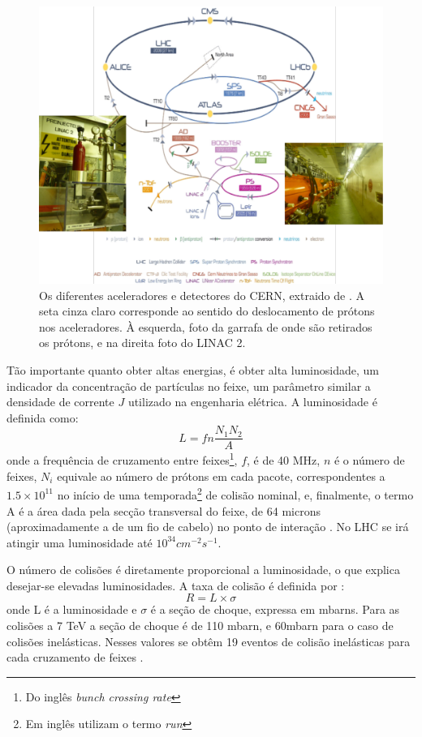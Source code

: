 \begin{figure}[h!t]
\centering
\includegraphics[width=\textwidth]{imagens/lhc_garrafa_linac2.pdf}
\caption{Os diferentes aceleradores e detectores do CERN, extraido de
\cite{cern_accelerators}. A seta cinza claro corresponde ao sentido do
deslocamento de prótons nos aceleradores. À esquerda, foto da garrafa
de onde são retirados os prótons, e na direita foto do LINAC 2.}
\label{fig:esquema_aceleradores}
\end{figure}

Tão importante quanto obter altas energias, é obter alta
luminosidade, um indicador da concentração 
de partículas no feixe, um parâmetro similar a densidade de 
corrente $J$ utilizado na engenharia elétrica. A luminosidade é definida como:
\begin{equation}
L=fn\frac{N_1 N_2}{A}
\label{eq:luminosidade}
\end{equation}
onde a frequência de cruzamento entre feixes\footnote{Do
inglês \emph{bunch crossing rate}}, $f$, é de 
40 MHz, $n$ é o número de feixes, $N_i$ equivale ao número de prótons em
cada pacote, correspondentes a $1.5\times10^{11}$ no início de uma
temporada\footnote{Em inglês utilizam o termo \emph{run}} de colisão nominal, e,
finalmente, o termo A é a área dada pela secção transversal do feixe, 
de 64 microns (aproximadamente a de um fio de cabelo)  no ponto de interação \cite{webLHC}. No LHC se
irá atingir uma luminosidade até $10^{34}cm^{-2}s^{-1}$.

O número de colisões é diretamente proporcional a luminosidade, o que explica
desejar-se elevadas luminosidades. A taxa de colisão é definida por
\cite{ATLAS_TDR}:
\begin{equation}
R = L \times \sigma
\label{eq:taxa_colisao}
\end{equation}
onde L é a luminosidade e $\sigma$ é a seção de choque,
expressa em mbarns. Para as colisões a 7 TeV a seção de choque é de 110 mbarn, e
60mbarn para o caso de colisões inelásticas.
Nesses valores se obtêm 19 eventos de colisão inelásticas para cada
cruzamento de feixes \cite{webLHC}.

